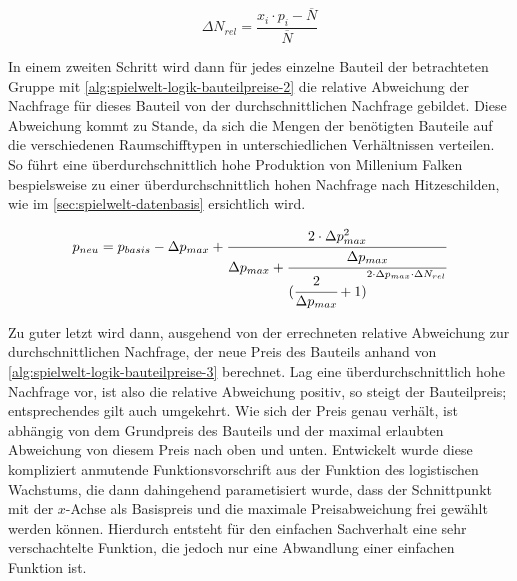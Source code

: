 \begin{equation}
     \Delta{}N_{rel} = \frac{x_i \cdot p_i - \overline{N}}{\overline{N}}
     \label{alg:spielwelt-logik-bauteilpreise-2}
\end{equation}

In einem zweiten Schritt wird dann für jedes einzelne Bauteil der betrachteten Gruppe mit
\ref{alg:spielwelt-logik-bauteilpreise-2} die relative Abweichung der Nachfrage für dieses Bauteil
von der durchschnittlichen Nachfrage gebildet. Diese Abweichung kommt zu Stande, da sich die Mengen
der benötigten Bauteile auf die verschiedenen Raumschifftypen in unterschiedlichen Verhältnissen
verteilen. So führt eine überdurchschnittlich hohe Produktion von Millenium Falken bespielsweise zu
einer überdurchschnittlich hohen Nachfrage nach Hitzeschilden, wie im \ref{sec:spielwelt-datenbasis}
ersichtlich wird.


\begin{equation}
     p_{neu} = p_{basis} -\Delta{}p_{max} + \cfrac{2 \cdot \Delta{}p_{max}^2}{\Delta{}p_{max} + \cfrac{\Delta{}p_{max}}{({\cfrac{2}{\Delta{}p_{max}} + 1)}^{2 \cdot \Delta{}p_{max} \cdot \Delta{}N_{rel}}}}
     \label{alg:spielwelt-logik-bauteilpreise-3}
\end{equation}

Zu guter letzt wird dann, ausgehend von der errechneten relative Abweichung zur durchschnittlichen
Nachfrage, der neue Preis des Bauteils anhand von \ref{alg:spielwelt-logik-bauteilpreise-3}
berechnet. Lag eine überdurchschnittlich hohe Nachfrage vor, ist also die relative Abweichung
positiv, so steigt der Bauteilpreis; entsprechendes gilt auch umgekehrt. Wie sich der Preis genau
verhält, ist abhängig von dem Grundpreis des Bauteils und der maximal erlaubten Abweichung von
diesem Preis nach oben und unten. Entwickelt wurde diese kompliziert anmutende Funktionsvorschrift
aus der Funktion des logistischen Wachstums, die dann dahingehend parametisiert wurde, dass der
Schnittpunkt mit der $x$-Achse als Basispreis und die maximale Preisabweichung frei gewählt werden
können. Hierdurch entsteht für den einfachen Sachverhalt eine sehr verschachtelte Funktion, die
jedoch nur eine Abwandlung einer einfachen Funktion ist.


